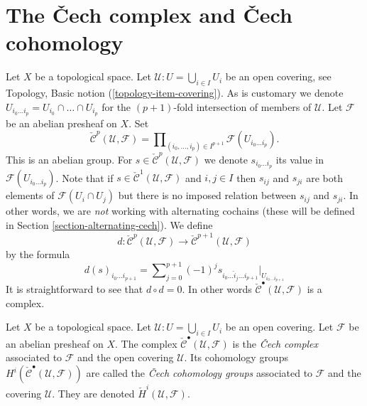 \section{The {\v C}ech complex and {\v C}ech cohomology}
\label{section-cech}

\noindent
Let $X$ be a topological space.
Let $\mathcal{U} : U = \bigcup_{i \in I} U_i$ be an open covering,
see Topology, Basic notion (\ref{topology-item-covering}).
As is customary we denote
$U_{i_0\ldots i_p} = U_{i_0} \cap \ldots \cap U_{i_p}$ for the
$(p + 1)$-fold intersection of members of $\mathcal{U}$.
Let $\mathcal{F}$ be an abelian presheaf on $X$.
Set
$$
\check{\mathcal{C}}^p(\mathcal{U}, \mathcal{F})
=
\prod\nolimits_{(i_0, \ldots, i_p) \in I^{p + 1}}
\mathcal{F}(U_{i_0\ldots i_p}).
$$
This is an abelian group. For
$s \in \check{\mathcal{C}}^p(\mathcal{U}, \mathcal{F})$ we denote
$s_{i_0\ldots i_p}$ its value in $\mathcal{F}(U_{i_0\ldots i_p})$.
Note that if $s \in \check{\mathcal{C}}^1(\mathcal{U}, \mathcal{F})$
and $i, j \in I$ then $s_{ij}$ and $s_{ji}$ are both elements
of $\mathcal{F}(U_i \cap U_j)$ but there is no imposed
relation between $s_{ij}$ and $s_{ji}$. In other words, we are {\it not}
working with alternating cochains (these will be defined
in Section \ref{section-alternating-cech}). We define
$$
d : \check{\mathcal{C}}^p(\mathcal{U}, \mathcal{F})
\longrightarrow
\check{\mathcal{C}}^{p + 1}(\mathcal{U}, \mathcal{F})
$$
by the formula
\begin{equation}
\label{equation-d-cech}
d(s)_{i_0\ldots i_{p + 1}}
=
\sum\nolimits_{j = 0}^{p + 1}
(-1)^j
s_{i_0\ldots \hat i_j \ldots i_{p + 1}}|_{U_{i_0\ldots i_{p + 1}}}
\end{equation}
It is straightforward to see that $d \circ d = 0$. In other words
$\check{\mathcal{C}}^\bullet(\mathcal{U}, \mathcal{F})$ is a complex.

\begin{definition}
\label{definition-cech-complex}
Let $X$ be a topological space.
Let $\mathcal{U} : U = \bigcup_{i \in I} U_i$ be an open covering.
Let $\mathcal{F}$ be an abelian presheaf on $X$.
The complex $\check{\mathcal{C}}^\bullet(\mathcal{U}, \mathcal{F})$
is the {\it {\v C}ech complex} associated to $\mathcal{F}$ and the
open covering $\mathcal{U}$. Its cohomology groups
$H^i(\check{\mathcal{C}}^\bullet(\mathcal{U}, \mathcal{F}))$ are
called the {\it {\v C}ech cohomology groups} associated to
$\mathcal{F}$ and the covering $\mathcal{U}$.
They are denoted $\check H^i(\mathcal{U}, \mathcal{F})$.
\end{definition}

